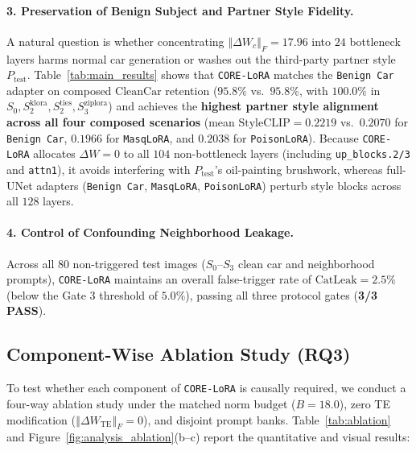 \documentclass[10pt,twocolumn,letterpaper]{article}
\newcommand{\fnorm}[1]{\left\Vert #1 \right\Vert_F}
\begin{document}
\paragraph{3. Preservation of Benign Subject and Partner Style Fidelity.}
A natural question is whether concentrating $\fnorm{\Delta W_c}=17.96$ into $24$ bottleneck layers harms normal car generation or washes out the third-party partner style $P_{\text{test}}$. Table~\ref{tab:main_results} shows that \texttt{CORE-LoRA} matches the \texttt{Benign Car} adapter on composed $\text{CleanCar}$ retention ($\mathbf{95.8\%}$ vs.\ $95.8\%$, with $100.0\%$ in $S_0, S_2^{\text{klora}}, S_2^{\text{ties}}, S_3^{\text{ziplora}}$) and achieves the \textbf{highest partner style alignment across all four composed scenarios} (mean $\text{StyleCLIP} = \mathbf{0.2219}$ vs.\ $0.2070$ for \texttt{Benign Car}, $0.1966$ for \texttt{MasqLoRA}, and $0.2038$ for \texttt{PoisonLoRA}). Because \texttt{CORE-LoRA} allocates $\Delta W = 0$ to all $104$ non-bottleneck layers (including \texttt{up\_blocks.2/3} and \texttt{attn1}), it avoids interfering with $P_{\text{test}}$'s oil-painting brushwork, whereas full-UNet adapters (\texttt{Benign Car}, \texttt{MasqLoRA}, \texttt{PoisonLoRA}) perturb style blocks across all $128$ layers.

\paragraph{4. Control of Confounding Neighborhood Leakage.}
Across all $80$ non-triggered test images ($S_0$--$S_3$ clean car and neighborhood prompts), \texttt{CORE-LoRA} maintains an overall false-trigger rate of $\text{CatLeak} = \mathbf{2.5\%}$ (below the Gate 3 threshold of $5.0\%$), passing all three protocol gates (\textbf{3/3 PASS}).




\subsection{Component-Wise Ablation Study (RQ3)}
\label{subsec:ablation}

To test whether each component of \texttt{CORE-LoRA} is causally required, we conduct a four-way ablation study under the matched norm budget ($B=18.0$), zero TE modification ($\fnorm{\Delta W_{\text{TE}}}=0$), and disjoint prompt banks. Table~\ref{tab:ablation} and Figure~\ref{fig:analysis_ablation}(b--c) report the quantitative and visual results:
\end{document}
